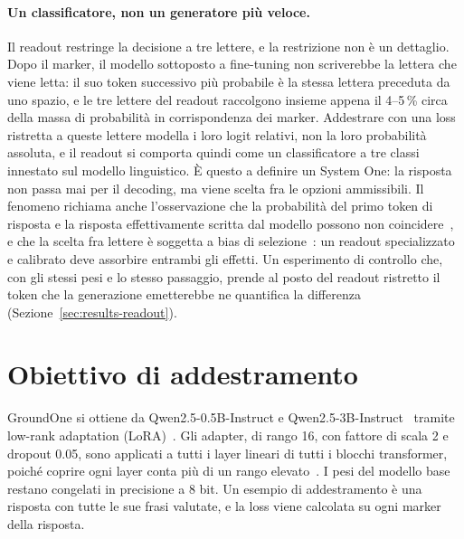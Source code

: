 \paragraph{Un classificatore, non un generatore più veloce.} Il readout restringe la decisione a tre lettere, e la
restrizione non è un dettaglio. Dopo il marker, il modello sottoposto a fine-tuning non scriverebbe la lettera che viene
letta: il suo token successivo più probabile è la stessa lettera preceduta da uno spazio, e le tre lettere del readout
raccolgono insieme appena il 4--5\,\% circa della massa di probabilità in corrispondenza dei marker. Addestrare con una
loss ristretta a queste lettere modella i loro logit relativi, non la loro probabilità assoluta, e il readout si
comporta quindi come un classificatore a tre classi innestato sul modello linguistico. È questo a definire un System
One: la risposta non passa mai per il decoding, ma viene scelta fra le opzioni ammissibili. Il fenomeno richiama anche
l'osservazione che la probabilità del primo token di risposta e la risposta effettivamente scritta dal modello possono
non coincidere~\cite{wang2024myanswerc}, e che la scelta fra lettere è soggetta a bias di selezione~\cite{zheng2024mcq}:
un readout specializzato e calibrato deve assorbire entrambi gli effetti. Un esperimento di controllo che, con gli
stessi pesi e lo stesso passaggio, prende al posto del readout ristretto il token che la generazione emetterebbe ne
quantifica la differenza (Sezione~\ref{sec:results-readout}).


\section{Obiettivo di addestramento}
\label{sec:method-training}

GroundOne si ottiene da Qwen2.5-0.5B-Instruct e Qwen2.5-3B-Instruct~\cite{qwen2024qwen25} tramite low-rank adaptation
(LoRA)~\cite{hu2022lora}. Gli adapter, di rango 16, con fattore di scala 2 e dropout 0.05, sono applicati a tutti i
layer lineari di tutti i blocchi transformer, poiché coprire ogni layer conta più di un rango
elevato~\cite{dettmers2023qlora}. I pesi del modello base restano congelati in precisione a 8 bit. Un esempio di
addestramento è una risposta con tutte le sue frasi valutate, e la loss viene calcolata su ogni marker della risposta.

